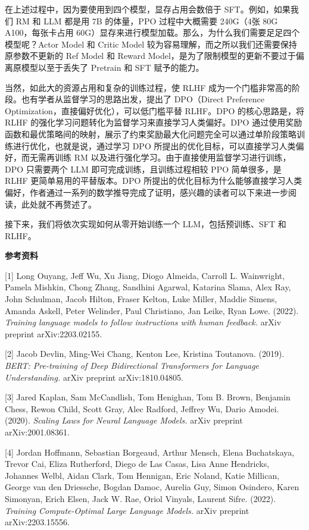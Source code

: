\documentclass[
]{article}
\begin{document}
在上述过程中，因为要使用到四个模型，显存占用会数倍于 SFT。例如，如果我们
RM 和 LLM 都是用 7B 的体量，PPO 过程中大概需要 240G（4张 80G
A100，每张卡占用
60G）显存来进行模型加载。那么，为什么我们需要足足四个模型呢？Actor Model
和 Critic Model 较为容易理解，而之所以我们还需要保持原参数不更新的 Ref
Model 和 Reward
Model，是为了限制模型的更新不要过于偏离原模型以至于丢失了 Pretrain 和
SFT 赋予的能力。

当然，如此大的资源占用和复杂的训练过程，使 RLHF
成为一个门槛非常高的阶段。也有学者从监督学习的思路出发，提出了
DPO（Direct Preference Optimization，直接偏好优化），可以低门槛平替
RLHF。DPO 的核心思路是，将 RLHF
的强化学习问题转化为监督学习来直接学习人类偏好。DPO
通过使用奖励函数和最优策略间的映射，展示了约束奖励最大化问题完全可以通过单阶段策略训练进行优化，也就是说，通过学习
DPO 所提出的优化目标，可以直接学习人类偏好，而无需再训练 RM
以及进行强化学习。由于直接使用监督学习进行训练，DPO 只需要两个 LLM
即可完成训练，且训练过程相较 PPO 简单很多，是 RLHF
更简单易用的平替版本。DPO
所提出的优化目标为什么能够直接学习人类偏好，作者通过一系列的数学推导完成了证明，感兴趣的读者可以下来进一步阅读，此处就不再赘述了。

接下来，我们将依次实现如何从零开始训练一个 LLM，包括预训练、SFT 和
RLHF。

\textbf{参考资料}

{[}1{]} Long Ouyang, Jeff Wu, Xu Jiang, Diogo Almeida, Carroll L.
Wainwright, Pamela Mishkin, Chong Zhang, Sandhini Agarwal, Katarina
Slama, Alex Ray, John Schulman, Jacob Hilton, Fraser Kelton, Luke
Miller, Maddie Simens, Amanda Askell, Peter Welinder, Paul Christiano,
Jan Leike, Ryan Lowe. (2022). \emph{Training language models to follow
instructions with human feedback.} arXiv preprint arXiv:2203.02155.

{[}2{]} Jacob Devlin, Ming-Wei Chang, Kenton Lee, Kristina Toutanova.
(2019). \emph{BERT: Pre-training of Deep Bidirectional Transformers for
Language Understanding.} arXiv preprint arXiv:1810.04805.

{[}3{]} Jared Kaplan, Sam McCandlish, Tom Henighan, Tom B. Brown,
Benjamin Chess, Rewon Child, Scott Gray, Alec Radford, Jeffrey Wu, Dario
Amodei. (2020). \emph{Scaling Laws for Neural Language Models.} arXiv
preprint arXiv:2001.08361.

{[}4{]} Jordan Hoffmann, Sebastian Borgeaud, Arthur Mensch, Elena
Buchatskaya, Trevor Cai, Eliza Rutherford, Diego de Las Casas, Lisa Anne
Hendricks, Johannes Welbl, Aidan Clark, Tom Hennigan, Eric Noland, Katie
Millican, George van den Driessche, Bogdan Damoc, Aurelia Guy, Simon
Osindero, Karen Simonyan, Erich Elsen, Jack W. Rae, Oriol Vinyals,
Laurent Sifre. (2022). \emph{Training Compute-Optimal Large Language
Models.} arXiv preprint arXiv:2203.15556.
\end{document}
